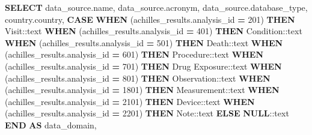 \documentclass[
]{book}
\newenvironment{Shaded}{\begin{snugshade}}{\end{snugshade}}
\newcommand{\CharTok}[1]{\textcolor[rgb]{0.31,0.60,0.02}{#1}}
\newcommand{\ControlFlowTok}[1]{\textcolor[rgb]{0.13,0.29,0.53}{\textbf{#1}}}
\newcommand{\DecValTok}[1]{\textcolor[rgb]{0.00,0.00,0.81}{#1}}
\newcommand{\KeywordTok}[1]{\textcolor[rgb]{0.13,0.29,0.53}{\textbf{#1}}}
\newcommand{\NormalTok}[1]{#1}
\newcommand{\OperatorTok}[1]{\textcolor[rgb]{0.81,0.36,0.00}{\textbf{#1}}}
\newcommand{\StringTok}[1]{\textcolor[rgb]{0.31,0.60,0.02}{#1}}
\begin{document}
\begin{Shaded}
\begin{Highlighting}[]
\KeywordTok{SELECT}\NormalTok{ data\_source.name,}
\NormalTok{   data\_source.acronym,}
\NormalTok{   data\_source.database\_type,}
\NormalTok{   country.country,}
       \ControlFlowTok{CASE}
           \ControlFlowTok{WHEN}\NormalTok{ (achilles\_results.analysis\_id }\OperatorTok{=} \DecValTok{201}\NormalTok{)}
             \ControlFlowTok{THEN} \StringTok{\textquotesingle{}Visit\textquotesingle{}}\NormalTok{:}\CharTok{:text}
           \ControlFlowTok{WHEN}\NormalTok{ (achilles\_results.analysis\_id }\OperatorTok{=} \DecValTok{401}\NormalTok{)}
             \ControlFlowTok{THEN} \StringTok{\textquotesingle{}Condition\textquotesingle{}}\NormalTok{:}\CharTok{:text}
           \ControlFlowTok{WHEN}\NormalTok{ (achilles\_results.analysis\_id }\OperatorTok{=} \DecValTok{501}\NormalTok{)}
             \ControlFlowTok{THEN} \StringTok{\textquotesingle{}Death\textquotesingle{}}\NormalTok{:}\CharTok{:text}
           \ControlFlowTok{WHEN}\NormalTok{ (achilles\_results.analysis\_id }\OperatorTok{=} \DecValTok{601}\NormalTok{)}
             \ControlFlowTok{THEN} \StringTok{\textquotesingle{}Procedure\textquotesingle{}}\NormalTok{:}\CharTok{:text}
           \ControlFlowTok{WHEN}\NormalTok{ (achilles\_results.analysis\_id }\OperatorTok{=} \DecValTok{701}\NormalTok{)}
             \ControlFlowTok{THEN} \StringTok{\textquotesingle{}Drug Exposure\textquotesingle{}}\NormalTok{:}\CharTok{:text}
           \ControlFlowTok{WHEN}\NormalTok{ (achilles\_results.analysis\_id }\OperatorTok{=} \DecValTok{801}\NormalTok{)}
             \ControlFlowTok{THEN} \StringTok{\textquotesingle{}Observation\textquotesingle{}}\NormalTok{:}\CharTok{:text}
           \ControlFlowTok{WHEN}\NormalTok{ (achilles\_results.analysis\_id }\OperatorTok{=} \DecValTok{1801}\NormalTok{)}
             \ControlFlowTok{THEN} \StringTok{\textquotesingle{}Measurement\textquotesingle{}}\NormalTok{:}\CharTok{:text}
           \ControlFlowTok{WHEN}\NormalTok{ (achilles\_results.analysis\_id }\OperatorTok{=} \DecValTok{2101}\NormalTok{)}
             \ControlFlowTok{THEN} \StringTok{\textquotesingle{}Device\textquotesingle{}}\NormalTok{:}\CharTok{:text}
           \ControlFlowTok{WHEN}\NormalTok{ (achilles\_results.analysis\_id }\OperatorTok{=} \DecValTok{2201}\NormalTok{)}
             \ControlFlowTok{THEN} \StringTok{\textquotesingle{}Note\textquotesingle{}}\NormalTok{:}\CharTok{:text}
           \ControlFlowTok{ELSE} \KeywordTok{NULL}\NormalTok{:}\CharTok{:text}
       \ControlFlowTok{END} \KeywordTok{AS}\NormalTok{ data\_domain,}

\end{Highlighting}
\end{Shaded}
\end{document}
